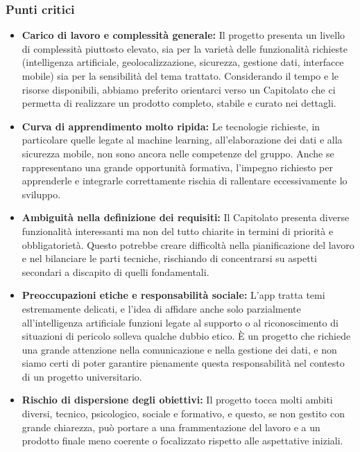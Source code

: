 \documentclass[a4paper,12pt]{article}
\begin{document}
\subsubsection{Punti critici}
\begin{itemize}
    \item \textbf{Carico di lavoro e complessità generale:} Il progetto presenta un livello di complessità piuttosto elevato, sia per la varietà delle funzionalità richieste (intelligenza artificiale, geolocalizzazione, sicurezza, gestione dati, interfacce mobile) sia per la sensibilità del tema trattato. Considerando il tempo e le risorse disponibili, abbiamo preferito orientarci verso un Capitolato che ci permetta di realizzare un prodotto completo, stabile e curato nei dettagli.
    \item \textbf{Curva di apprendimento molto ripida:} Le tecnologie richieste, in particolare quelle legate al machine learning, all’elaborazione dei dati e alla sicurezza mobile, non sono ancora nelle competenze del gruppo. Anche se rappresentano una grande opportunità formativa, l’impegno richiesto per apprenderle e integrarle correttamente rischia di rallentare eccessivamente lo sviluppo.
    \item \textbf{Ambiguità nella definizione dei requisiti:} Il Capitolato presenta diverse funzionalità interessanti ma non del tutto chiarite in termini di priorità e obbligatorietà. Questo potrebbe creare difficoltà nella pianificazione del lavoro e nel bilanciare le parti tecniche, rischiando di concentrarsi su aspetti secondari a discapito di quelli fondamentali.
    \item \textbf{Preoccupazioni etiche e responsabilità sociale:} L’app tratta temi estremamente delicati, e l’idea di affidare anche solo parzialmente all’intelligenza artificiale funzioni legate al supporto o al riconoscimento di situazioni di pericolo solleva qualche dubbio etico. È un progetto che richiede una grande attenzione nella comunicazione e nella gestione dei dati, e non siamo certi di poter garantire pienamente questa responsabilità nel contesto di un progetto universitario.
    \item \textbf{Rischio di dispersione degli obiettivi:} Il progetto tocca molti ambiti diversi, tecnico, psicologico, sociale e formativo, e questo, se non gestito con grande chiarezza, può portare a una frammentazione del lavoro e a un prodotto finale meno coerente o focalizzato rispetto alle aspettative iniziali.
\end{itemize}
\end{document}
